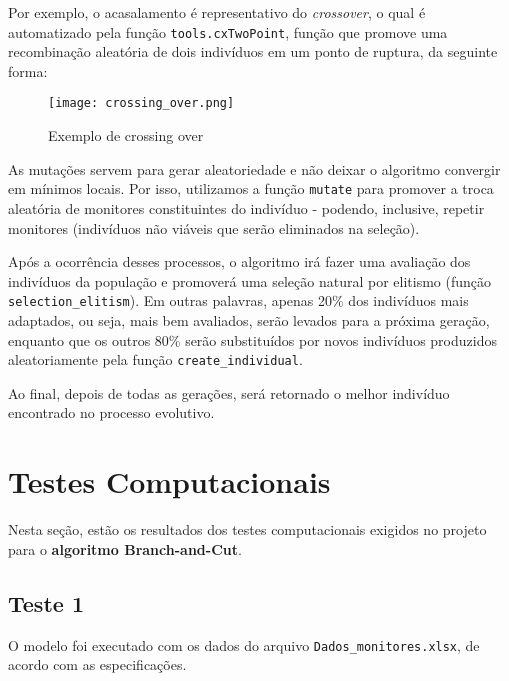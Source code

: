 \documentclass[a4paper,12pt]{article}
\begin{document}
Por exemplo, o acasalamento é representativo do \textit{crossover}, o qual é automatizado pela função \texttt{tools.cxTwoPoint}, função que promove uma recombinação aleatória de dois indivíduos em um ponto de ruptura, da seguinte forma:

\begin{figure}[h!]
    \centering
    \texttt{[image: crossing\_over.png]}
    \caption{Exemplo de crossing over}
    \label{fig:exemplo}
\end{figure}


As mutações servem para gerar aleatoriedade e não deixar o algoritmo convergir em mínimos locais. Por isso, utilizamos a função \texttt{mutate} para promover a troca aleatória de monitores constituintes do indivíduo - podendo, inclusive, repetir monitores (indivíduos não viáveis que serão eliminados na seleção).

Após a ocorrência desses processos, o algoritmo irá fazer uma avaliação dos indivíduos da população e promoverá uma seleção natural por elitismo (função \texttt{selection\_elitism}). Em outras palavras, apenas 20\% dos indivíduos mais adaptados, ou seja, mais bem avaliados, serão levados para a próxima geração, enquanto que os outros 80\% serão substituídos por novos indivíduos produzidos aleatoriamente pela função \texttt{create\_individual}.

Ao final, depois de todas as gerações, será retornado o melhor indivíduo encontrado no processo evolutivo.

\section{Testes Computacionais}

Nesta seção, estão os resultados dos testes computacionais exigidos no projeto para o \textbf{algoritmo Branch-and-Cut}.

\subsection{Teste 1}

O modelo foi executado com os dados do arquivo \verb|Dados_monitores.xlsx|, de acordo com as especificações.
\end{document}
